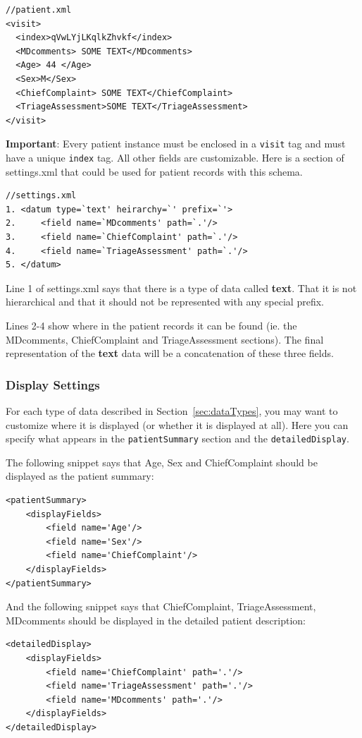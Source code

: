 \documentclass[12pt]{article}
\begin{document}
\begin{verbatim}
//patient.xml
<visit>
  <index>qVwLYjLKqlkZhvkf</index>
  <MDcomments> SOME TEXT</MDcomments>
  <Age> 44 </Age>
  <Sex>M</Sex>
  <ChiefComplaint> SOME TEXT</ChiefComplaint>
  <TriageAssessment>SOME TEXT</TriageAssessment>
</visit>
\end{verbatim}
{\bf Important}: Every patient instance must be enclosed in a {\tt visit} tag and must have a unique {\tt index} tag. All other fields are customizable.
Here is a section of settings.xml that could be used for patient records with this schema.

\begin{verbatim}
//settings.xml
1. <datum type=`text' heirarchy=`' prefix=`'>
2.     <field name=`MDcomments' path=`.'/>
3.     <field name=`ChiefComplaint' path=`.'/>
4.     <field name=`TriageAssessment' path=`.'/>
5. </datum>
\end{verbatim}

Line 1 of settings.xml says that there is a type of data called {\bf text}. That it is not hierarchical and that it should not be represented with any special prefix.

Lines 2-4 show where in the patient records it can be found (ie. the MDcomments, ChiefComplaint and TriageAssessment sections). The final representation of the {\bf text} data will be a concatenation of these three fields.

\subsubsection{Display Settings}
\label{sec:display_settings}
For each type of data described in Section~\ref{sec:dataTypes}, you may want to customize where it is displayed (or whether it is displayed at all). Here you can specify what appears in the {\tt patientSummary} section and the {\tt detailedDisplay}. 

The following snippet says that Age, Sex and ChiefComplaint should be displayed as the patient summary:
\begin{verbatim}
<patientSummary>
    <displayFields>
        <field name='Age'/>
        <field name='Sex'/>
        <field name='ChiefComplaint'/>
    </displayFields>
</patientSummary>
\end{verbatim}

And the following snippet says that ChiefComplaint, TriageAssessment, MDcomments should be displayed in the detailed patient description:

\begin{verbatim}
<detailedDisplay>
    <displayFields>
        <field name='ChiefComplaint' path='.'/>
        <field name='TriageAssessment' path='.'/>
        <field name='MDcomments' path='.'/>
    </displayFields>
</detailedDisplay>
\end{verbatim}
\end{document}
